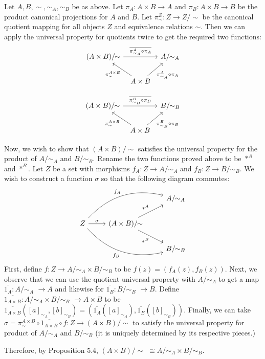 \documentclass[12pt,letterpaper,boxed]{hmcpset}
\newcommand{\quotuniv}[1]{\overline{#1}}
\newcommand{\quot}[2]{#1/\!\!#2\,\,}
\newcommand{\quotntws}[2]{#1/\!\!#2}
\begin{document}
\begin{solution}
	Let $A,B,\sim,\sim_A,\sim_B$ be as above. Let $\pi_A:A\times B\to A$ and
	$\pi_B:A\times B\to B$ be the product canonical projections for $A$ and $B$. Let
	$\pi^Z_\sim:Z\to\quotntws{Z}{\sim}$ be the canonical quotient mapping for all
	objects $Z$ and equivalence relations $\sim$. Then we can apply the universal
	property for quotients twice to get the required two functions:
	\[\begin{tikzcd}[column sep=tiny]
	\quotntws{(A\times B)}{\sim} \arrow[rr,"\quotuniv{\pi^A_{\sim_A}\circ\pi_A}"] && \quotntws{A}{\sim_A} \\
	&A\times B \arrow[ul,"\pi^{A\times B}_\sim"] \arrow[ur,swap, "\pi^A_{\sim_A}\circ\pi_A"]&
	\end{tikzcd}\]
	
	\[\begin{tikzcd}[column sep=tiny]
	\quotntws{(A\times B)}{\sim} \arrow[rr,"\quotuniv{\pi^B_{\sim_B}\circ\pi_B}"] && \quotntws{B}{\sim_B} \\
	&A\times B \arrow[ul,"\pi^{A\times B}_\sim"] \arrow[ur,swap, "\pi^B_{\sim_B}\circ\pi_B"]&
	\end{tikzcd}\]
	
	\def \quotA {\quotntws{A}{\sim_A}}
	\def \quotB {\quotntws{B}{\sim_B}}
	
	Now, we wish to show that $\quotntws{(A\times B)}{\sim}$ satisfies the universal
	property for the product of $\quotA$ and $\quotB$. Rename the two functions
	proved above to be $*^A$ and $*^B$. Let $Z$ be a set with morphisms
	$f_A:Z\to\quotA$ and $f_B:Z\to\quotB$. We wish to construct a function $\sigma$
	so that the following diagram commutes:
	\[\begin{tikzcd}
	&& \quotntws{A}{\sim_A} \\
	Z\arrow[r,"\sigma"]\arrow[urr,bend left,"f_A"]\arrow[drr,bend right,swap,"f_B"]
	&\quotntws{(A\times B)}{\sim}\arrow[ur,"*^A"]\arrow[dr,swap,"*^B"] \\
	&& \quotntws{B}{\sim_B}
	\end{tikzcd}\]
	\def \quotAB {\quotA\times\quotB}
	First, define $f:Z\to\quotAB$ to be $f(z)=(f_A(z),f_B(z))$. Next, we observe
	that we can use the quotient universal property with $\quotA$ to get a map
	$\quotuniv{1_A}:\quotA\,\,\to A$ and likewise for $\quotuniv{1_B}:\quotB\,\,\to
	B$. Define $\quotuniv{1_{A\times B}}:\quotAB\,\,\to A\times B$ to be
	$\quotuniv{1_{A\times B}}([a]_{\sim_A},[b]_{\sim_B}) =
	(\quotuniv{1_A}([a]_{\sim_A}), \quotuniv{1_B}([b]_{\sim_B}))$. Finally, we can
	take $\sigma=\pi^{A\times B}_\sim \circ \quotuniv{1_{A\times B}} \circ
	f:Z\to\quotntws{(A\times B)}{\sim}$ to satisfy the universal property for
	product of $\quotA$ and $\quotB$ (it is uniquely determined by its respective
	pieces.)
	
	Therefore, by Proposition 5.4, $\quot{(A\times B)}{\sim}\cong\quotA \times
	\quotB$.
\end{solution}
\end{document}
